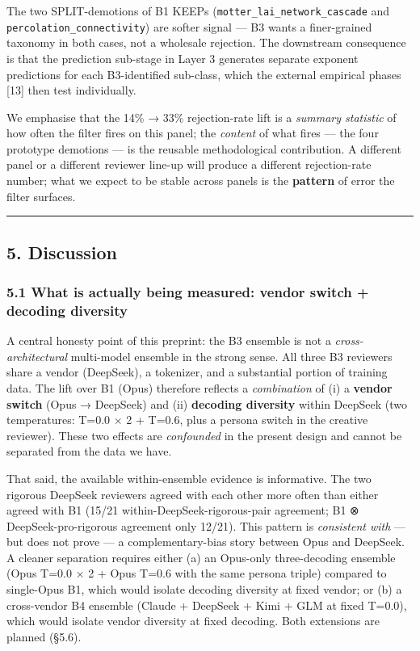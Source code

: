 \documentclass[
  letterpaper,
  11pt]{article}
\begin{document}
The two SPLIT-demotions of B1 KEEPs
(\texttt{motter\_lai\_network\_cascade} and
\texttt{percolation\_connectivity}) are softer signal --- B3 wants a
finer-grained taxonomy in both cases, not a wholesale rejection. The
downstream consequence is that the prediction sub-stage in Layer 3
generates separate exponent predictions for each B3-identified
sub-class, which the external empirical phases {[}13{]} then test
individually.

We emphasise that the 14\% → 33\% rejection-rate lift is a \emph{summary
statistic} of how often the filter fires on this panel; the
\emph{content} of what fires --- the four prototype demotions --- is the
reusable methodological contribution. A different panel or a different
reviewer line-up will produce a different rejection-rate number; what we
expect to be stable across panels is the \textbf{pattern} of error the
filter surfaces.

\begin{center}\rule{0.5\linewidth}{0.5pt}\end{center}

\subsection{5. Discussion}\label{discussion}

\subsubsection{5.1 What is actually being measured: vendor switch +
decoding
diversity}\label{what-is-actually-being-measured-vendor-switch-decoding-diversity}

A central honesty point of this preprint: the B3 ensemble is not a
\emph{cross-architectural} multi-model ensemble in the strong sense. All
three B3 reviewers share a vendor (DeepSeek), a tokenizer, and a
substantial portion of training data. The lift over B1 (Opus) therefore
reflects a \emph{combination} of (i) a \textbf{vendor switch} (Opus →
DeepSeek) and (ii) \textbf{decoding diversity} within DeepSeek (two
temperatures: T=0.0 × 2 + T=0.6, plus a persona switch in the creative
reviewer). These two effects are \emph{confounded} in the present design
and cannot be separated from the data we have.

That said, the available within-ensemble evidence is informative. The
two rigorous DeepSeek reviewers agreed with each other more often than
either agreed with B1 (15/21 within-DeepSeek-rigorous-pair agreement; B1
⊗ DeepSeek-pro-rigorous agreement only 12/21). This pattern is
\emph{consistent with} --- but does not prove --- a complementary-bias
story between Opus and DeepSeek. A cleaner separation requires either
(a) an Opus-only three-decoding ensemble (Opus T=0.0 × 2 + Opus T=0.6
with the same persona triple) compared to single-Opus B1, which would
isolate decoding diversity at fixed vendor; or (b) a cross-vendor B4
ensemble (Claude + DeepSeek + Kimi + GLM at fixed T=0.0), which would
isolate vendor diversity at fixed decoding. Both extensions are planned
(§5.6).
\end{document}
